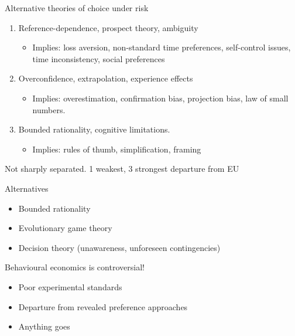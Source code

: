 \documentclass[11pt, aspectratio=169]{beamer}
\begin{document}
\begin{frame}{Alternative theories of choice under risk}
    \begin{enumerate}
        \item Reference-dependence, prospect theory, ambiguity\medskip
        \begin{itemize}
        \item Implies: loss aversion, non-standard time preferences, self-control issues, time inconsistency, social preferences
        \end{itemize}\medskip
        \item Overconfidence, extrapolation, experience effects\medskip
         \begin{itemize}
        \item Implies: overestimation, confirmation bias, projection bias, law of small numbers.  \end{itemize}\medskip
                \item Bounded rationality, cognitive limitations.\medskip
        \begin{itemize}
        \item Implies: rules of thumb, simplification, framing
        \end{itemize}\medskip
    \end{enumerate}
    Not sharply separated.  1 weakest, 3 strongest departure  from EU
\end{frame}

\begin{frame}{Alternatives}
    \begin{itemize}
        \item Bounded rationality\bigskip
        \item Evolutionary game theory\bigskip
        \item Decision theory (unawareness, unforeseen contingencies)\bigskip
    \end{itemize}\bigskip
\end{frame}
\begin{frame}{Behavioural economics is controversial!}
    \begin{itemize}
        \item Poor experimental standards\medskip
        \item Departure from revealed preference approaches\medskip
        \item Anything goes\medskip
    \end{itemize}
\end{frame}
\end{document}
